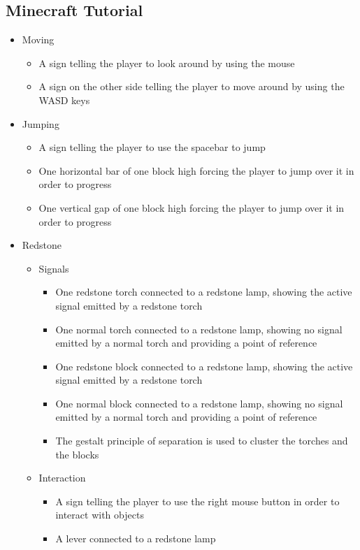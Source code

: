 \documentclass[11pt,twoside]{report} %
\begin{document}
\subsection{Minecraft Tutorial}

\begin{itemize}
	\item Moving
	\begin{itemize}
		\item A sign telling the player to look around by using the mouse
		\item A sign on the other side telling the player to move around by using the WASD keys
	\end{itemize}
	\item Jumping
	\begin{itemize}
		\item A sign telling the player to use the spacebar to jump
		\item One horizontal bar of one block high forcing the player to jump over it in order to progress
		\item One vertical gap of one block high forcing the player to jump over it in order to progress
	\end{itemize}
	\item Redstone
	\begin{itemize}
		\item Signals
		\begin{itemize}
			\item One redstone torch connected to a redstone lamp, showing the active signal emitted by a redstone torch
			\item One normal torch connected to a redstone lamp, showing no signal emitted by a normal torch and providing a point of reference
			\item One redstone block connected to a redstone lamp, showing the active signal emitted by a redstone torch
			\item One normal block connected to a redstone lamp, showing no signal emitted by a normal torch and providing a point of reference
			\item The gestalt principle of separation is used to cluster the torches and the blocks
		\end{itemize}
		\item Interaction
		\begin{itemize}
			\item A sign telling the player to use the right mouse button in order to interact with objects
			\item A lever connected to a redstone lamp

\end{itemize}
\end{itemize}
\end{itemize}
\end{document}

